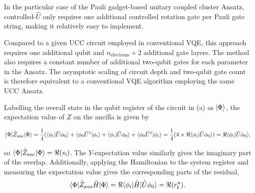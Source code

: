 \documentclass[%
 reprint,
 amsmath,amssymb,
 aps,
]{revtex4-2}
\begin{document}
In the particular case of the Pauli gadget-based unitary coupled cluster Ansatz, controlled-$\hat U$ only requires one additional controlled rotation gate per Pauli gate string, making it relatively easy to implement. { Compared to a given UCC circuit employed in conventional VQE, this approach requires one additional qubit and $n_\mathrm{electrons} + 2$ additional gate layers. The method also requires a constant number of additional two-qubit gates for each parameter in the Ansatz. The asymptotic scaling of circuit depth and two-qubit gate count is therefore equivalent to a conventional VQE algorithm employing the same UCC Ansatz.


Labelling the overall state in the qubit register of the circuit in  (a) as $\ket{\Phi}$, the expectation value of $Z$ on the ancilla is given by
\begin{widetext}
\begin{equation}
        \braket{\Phi|\hat Z_\mathrm{anc}|\Phi} =\frac{1}{4} (\braket{\phi_i| \hat U\phi_0} + \braket{\phi_0 \hat U^\dagger|\phi_i} + \braket{\phi_i| \hat U \phi_0} + \braket{\phi_0 \hat U^\dagger|\phi_i}
        = \frac{1}{4} (4 \times \Re{\braket{\phi_i|\hat U\phi_0}}) = \Re{\braket{\phi_i|\hat U\phi_0}},
\end{equation}
\end{widetext}
so $\braket{\Phi|\hat Z_\mathrm{anc}|\Phi} = \Re{(s_\mathrm{i})}$. The $Y$-expectation value similarly gives the imaginary part of the overlap. Additionally, applying the Hamiltonian to the system register and measuring the expectation value gives the corresponding parts of the residual,
\begin{equation}
\braket{\Phi|\hat Z_\mathrm{aux}\hat H|\Phi} = \Re{\braket{\phi_i|\hat H|\hat U\phi_0}} = \Re{(r^u_\mathbf{i})}.
\label{eq:rri}
\end{equation}

}
\end{document}
